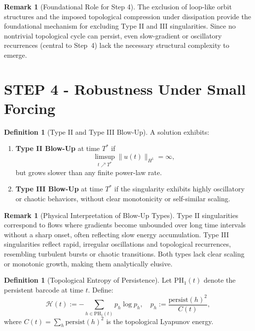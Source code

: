 \documentclass[11pt]{article}
\theoremstyle{definition}
\newtheorem{definition}[theorem]{Definition}
\newtheorem{remark}[theorem]{Remark}
\begin{document}
\begin{remark}[Foundational Role for Step 4]
The exclusion of loop-like orbit structures and the imposed topological compression under dissipation provide the foundational mechanism for excluding Type II and III singularities. Since no nontrivial topological cycle can persist, even slow-gradient or oscillatory recurrences (central to Step~4) lack the necessary structural complexity to emerge.
\end{remark}



\section{STEP 4 - Robustness Under Small Forcing}

\begin{definition}[Type II and Type III Blow-Up]
A solution exhibits:
\begin{enumerate}
  \item \textbf{Type II Blow-Up} at time $T^*$ if
  \[
  \limsup_{t \nearrow T^*} \|u(t)\|_{H^1} = \infty,
  \]
  but grows slower than any finite power-law rate.

  \item \textbf{Type III Blow-Up} at time $T^*$ if the singularity exhibits highly oscillatory or chaotic behaviors, without clear monotonicity or self-similar scaling.
\end{enumerate}
\end{definition}

\begin{remark}[Physical Interpretation of Blow-Up Types]
Type II singularities correspond to flows where gradients become unbounded over long time intervals without a sharp onset, often reflecting slow energy accumulation. Type III singularities reflect rapid, irregular oscillations and topological recurrences, resembling turbulent bursts or chaotic transitions. Both types lack clear scaling or monotonic growth, making them analytically elusive.
\end{remark}

\begin{definition}[Topological Entropy of Persistence]
Let $\mathrm{PH}_1(t)$ denote the persistent barcode at time $t$. Define:
\[
\mathcal{H}(t) := -\sum_{h \in \mathrm{PH}_1(t)} p_h \log p_h, \quad p_h := \frac{\mathrm{persist}(h)^2}{C(t)},
\]
where $C(t) = \sum_{h} \mathrm{persist}(h)^2$ is the topological Lyapunov energy.
\end{definition}
\end{document}
